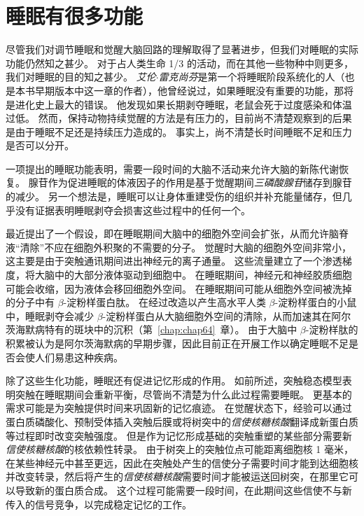 \section{睡眠有很多功能}

尽管我们对调节睡眠和觉醒大脑回路的理解取得了显著进步，但我们对睡眠的实际功能仍然知之甚少。
对于占人类生命 1/3 的活动，而在其他一些物种中则更多，我们对睡眠的目的知之甚少。
\textit{艾伦$\cdot$雷克尚芬}是第一个将睡眠阶段系统化的人（也是本书早期版本中这一章的作者），他曾经说过，如果睡眠没有重要的功能，那将是进化史上最大的错误。
他发现如果长期剥夺睡眠，老鼠会死于过度感染和体温过低。
然而，保持动物持续觉醒的方法是有压力的，目前尚不清楚观察到的后果是由于睡眠不足还是持续压力造成的。
事实上，尚不清楚长时间睡眠不足和压力是否可以分开。


一项提出的睡眠功能表明，需要一段时间的大脑不活动来允许大脑的新陈代谢恢复。
腺苷作为促进睡眠的体液因子的作用是基于觉醒期间\textit{三磷酸腺苷}储存到腺苷的减少。
另一个想法是，睡眠可以让身体重建受伤的组织并补充能量储存，但几乎没有证据表明睡眠剥夺会损害这些过程中的任何一个。


最近提出了一个假设，即在睡眠期间大脑中的细胞外空间会扩张，从而允许脑脊液“清除”不应在细胞外积聚的不需要的分子。
觉醒时大脑的细胞外空间非常小，这主要是由于突触通讯期间进出神经元的离子通量。
这些流量建立了一个渗透梯度，将大脑中的大部分液体驱动到细胞中。
在睡眠期间，神经元和神经胶质细胞可能会收缩，因为液体会移回细胞外空间。
在睡眠期间可能从细胞外空间被洗掉的分子中有 $ \beta $-淀粉样蛋白肽。
在经过改造以产生高水平人类 $ \beta $-淀粉样蛋白的小鼠中，睡眠剥夺会减少 $ \beta $-淀粉样蛋白从大脑细胞外空间的清除，从而加速其在阿尔茨海默病特有的斑块中的沉积（第~\ref{chap:chap64}~章）。
由于大脑中 $ \beta $-淀粉样肽的积累被认为是阿尔茨海默病的早期步骤，因此目前正在开展工作以确定睡眠不足是否会使人们易患这种疾病。


除了这些生化功能，睡眠还有促进记忆形成的作用。
如前所述，突触稳态模型表明突触在睡眠期间会重新平衡，尽管尚不清楚为什么此过程需要睡眠。
更基本的需求可能是为突触提供时间来巩固新的记忆痕迹。
在觉醒状态下，经验可以通过蛋白质磷酸化、预制受体插入突触后膜或将树突中的\textit{信使核糖核酸}翻译成新蛋白质等过程即时改变突触强度。
但是作为记忆形成基础的突触重塑的某些部分需要新\textit{信使核糖核酸}的核依赖性转录。
由于树突上的突触位点可能距离细胞核 1 毫米，在某些神经元中甚至更远，因此在突触处产生的信使分子需要时间才能到达细胞核并改变转录，然后将产生的\textit{信使核糖核酸}需要时间才能被运送回树突，在那里它可以导致新的蛋白质合成。
这个过程可能需要一段时间，在此期间这些信使不与新传入的信号竞争，以完成稳定记忆的工作。


